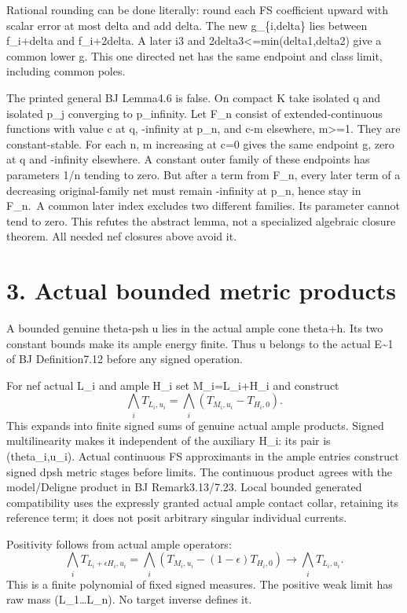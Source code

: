 \documentclass[
  10pt,
]{article}
\begin{document}
Rational rounding can be done literally: round each FS coefficient
upward with scalar error at most delta and add delta. The new
g\_\{i,delta\} lies between f\_i+delta and f\_i+2delta. A later i3 and
2delta3\textless=min(delta1,delta2) give a common lower g. This one
directed net has the same endpoint and class limit, including common
poles.

The printed general BJ Lemma4.6 is false. On compact K take isolated q
and isolated p\_j converging to p\_infinity. Let F\_n consist of
extended-continuous functions with value c at q, -infinity at p\_n, and
c-m elsewhere, m\textgreater=1. They are constant-stable. For each n, m
increasing at c=0 gives the same endpoint g, zero at q and -infinity
elsewhere. A constant outer family of these endpoints has parameters 1/n
tending to zero. But after a term from F\_n, every later term of a
decreasing original-family net must remain -infinity at p\_n, hence stay
in F\_n.~A common later index excludes two different families. Its
parameter cannot tend to zero. This refutes the abstract lemma, not a
specialized algebraic closure theorem. All needed nef closures above
avoid it.

\section{3. Actual bounded metric
products}\label{actual-bounded-metric-products}

A bounded genuine theta-psh u lies in the actual ample cone theta+h. Its
two constant bounds make its ample energy finite. Thus u belongs to the
actual E\textasciitilde1 of BJ Definition7.12 before any signed
operation.

For nef actual L\_i and ample H\_i set M\_i=L\_i+H\_i and construct \[
 \bigwedge_iT_{L_i,u_i}=\bigwedge_i(T_{M_i,u_i}-T_{H_i,0}).                \tag{3.1}
\] This expands into finite signed sums of genuine actual ample
products. Signed multilinearity makes it independent of the auxiliary
H\_i: its pair is (theta\_i,u\_i). Actual continuous FS approximants in
the ample entries construct signed dpsh metric stages before limits. The
continuous product agrees with the model/Deligne product in BJ
Remark3.13/7.23. Local bounded generated compatibility uses the
expressly granted actual ample contact collar, retaining its reference
term; it does not posit arbitrary singular individual currents.

Positivity follows from actual ample operators: \[
 \bigwedge_iT_{L_i+\epsilon H_i,u_i}
 =\bigwedge_i(T_{M_i,u_i}-(1-\epsilon)T_{H_i,0})
 \longrightarrow\bigwedge_iT_{L_i,u_i}.                                 \tag{3.2}
\] This is a finite polynomial of fixed signed measures. The positive
weak limit has raw mass (L\_1\ldots L\_n). No target inverse defines it.
\end{document}
